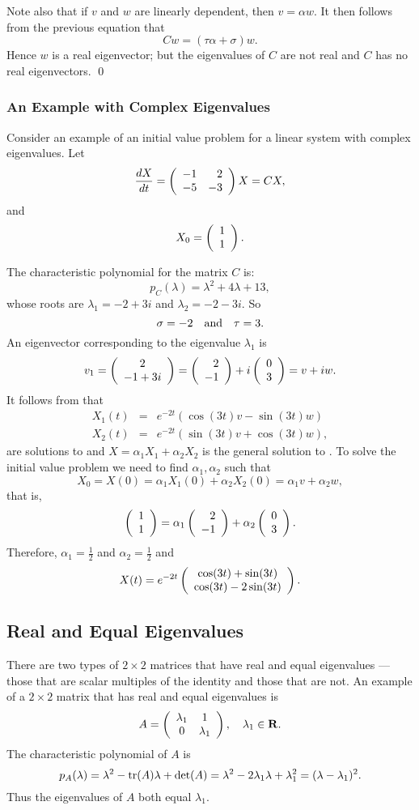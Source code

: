 Note also that if $v$ and $w$ are linearly dependent, then $v=\alpha w$.
It then follows from the previous equation that
\[
Cw = (\tau\alpha+\sigma)w.
\]
Hence $w$ is a real eigenvector; but the eigenvalues of $C$ are not real and
$C$ has no real eigenvectors.   \qed


\subsubsection*{An Example with Complex Eigenvalues}

Consider an example of an initial value problem for a linear system with
complex eigenvalues.  Let
\begin{equation}  \label{e:complexexample}
\frac{dX}{dt} = \left(\begin{array}{rr} -1 & 2\\ -5 &-3\end{array}\right) X = CX,
\end{equation}
and
\[
X_0=\left(\begin{array}{r} 1 \\ 1\end{array}\right).
\]

The characteristic polynomial for the
matrix $C$ is:
\[
p_C(\lambda) = \lambda^2 +4\lambda + 13,
\]
whose roots are $\lambda_1 = -2+3i$ and $\lambda_2 = -2-3i$. So
\[
\sigma = -2 \quad\mbox{and}\quad \tau = 3.
\]
An eigenvector corresponding to the eigenvalue $\lambda_1$ is
\[
v_1 = \left(\begin{array}{c} 2 \\ -1+3i\end{array}\right) = \left(\begin{array}{r} 2 \\ -1\end{array}\right)+i\left(\begin{array}{r} 0 \\ 3\end{array}\right)=v+iw.
\]
It follows from  that
\[
\begin{array}{rcl}
X_1(t) & = & e^{-2t}(\cos(3t)v -\sin(3t)w)\\
X_2(t) & = & e^{-2t}(\sin(3t)v +\cos(3t)w),
\end{array}
\]
are solutions to  and $X=\alpha_1X_1+\alpha_2X_2$ is
the general solution to .  To solve the initial value
problem we need to find $\alpha_1,\alpha_2$ such that
\[
X_0 = X(0) = \alpha_1X_1(0) + \alpha_2X_2(0) = \alpha_1 v + \alpha_2 w,
\]
that is,
\[
\left(\begin{array}{r} 1 \\ 1\end{array}\right) = \alpha_1\left(\begin{array}{r} 2 \\ -1\end{array}\right)  + \alpha_2\left(\begin{array}{r} 0 \\ 3\end{array}\right).
\]
Therefore, $\alpha_1 = \frac{1}{2}$ and $\alpha_2=\frac{1}{2}$ and
\begin{equation}  \label{e:complexexampleans}
X(t) =  e^{-2t}\left(\begin{array}{c} \cos(3t)+\sin(3t) \\ \cos(3t)-2\sin(3t)\end{array}\right).
\end{equation}

\subsection*{Real and Equal Eigenvalues}

There are two types of $2\times 2$ matrices that have real and equal
eigenvalues --- those that are scalar multiples of the identity and those
that are not.  An example of a $2\times 2$ matrix that has real and equal
eigenvalues is
\begin{equation}  \label{E:equalex}
A = \left(\begin{array}{cc} \lambda_1 & 1\\ 0 &\lambda_1\end{array}\right), \quad \lambda_1\in\mbox{$\bf{R}$}.
\end{equation}
The characteristic polynomial of $A$ is
\[
p_A(\lambda) = \lambda^2 - {\rm tr}(A)\lambda + \det(A) =
\lambda^2 -2\lambda_1\lambda + \lambda_1^2 = (\lambda-\lambda_1)^2.
\]
Thus the eigenvalues of $A$ both equal $\lambda_1$.

